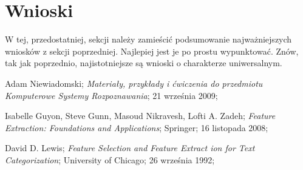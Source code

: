 \documentclass{classrep}
\begin{document}
\section{Wnioski}
{\color{blue}W tej, przedostatniej, sekcji należy zamieścić podsumowanie
najważniejszych wniosków z sekcji poprzedniej. Najlepiej jest je po prostu
wypunktować. Znów, tak jak poprzednio, najistotniejsze są wnioski o
charakterze uniwersalnym.}


\begin{thebibliography}{0}

 Adam Niewiadomski;
\textsl{Materiały, przykłady i ćwiczenia do przedmiotu
Komputerowe Systemy Rozpoznawania}; 21 września 2009;

 Isabelle Guyon, Steve Gunn, Masoud Nikravesh, Lofti A. Zadeh;
\textsl{Feature Extraction: Foundations and Applications}; Springer; 16 listopada 2008;

 David D. Lewis;
\textsl{Feature Selection and Feature Extract ion for Text Categorization}; University of Chicago; 26 września 1992;


\end{thebibliography}
\end{document}

